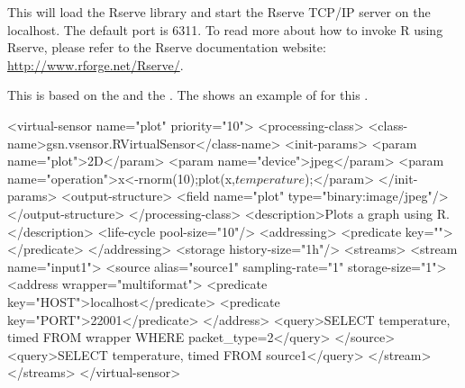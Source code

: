 This will load the Rserve library and start the Rserve TCP/IP server on the localhost. The default port is 6311. To read more about how to invoke R using Rserve, please refer to the Rserve documentation website: \url{http://www.rforge.net/Rserve/}.

This \vs is based on the  \vsp and the  \wrapper.
The  shows an example of \vsd for this \vs.

\begin{xmlcode}[caption={Sample of R VSD file}, label=listing:xml:voip_vsd]
<virtual-sensor name="plot" priority="10">
	<processing-class>
	<class-name>gsn.vsensor.RVirtualSensor</class-name>
		<init-params>
      <param name="plot">2D</param>
			<param name="device">jpeg</param>
			<param name="operation">x<-rnorm(10);plot(x,$temperature$);</param>
		</init-params>
		<output-structure>
			<field name="plot" type="binary:image/jpeg"/>
		</output-structure>
	</processing-class>
	<description>Plots a graph using R.</description>
	<life-cycle pool-size="10"/>
	<addressing>
		<predicate key=""></predicate>
	</addressing>
	<storage history-size="1h"/>
  <streams>
    <stream name="input1">
    <source alias="source1" sampling-rate="1" storage-size="1">
      <address wrapper="multiformat">
          <predicate key="HOST">localhost</predicate>
          <predicate key="PORT">22001</predicate>
      </address>
      <query>SELECT temperature, timed FROM wrapper WHERE packet_type=2</query>
    </source>
    <query>SELECT temperature, timed FROM source1</query>
    </stream> 
  </streams>
</virtual-sensor>
\end{xmlcode}
